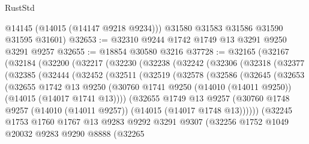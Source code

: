 \begin{lexlean}{RustStd}
\begin{coremodule}
        @14145
        (@14015 (@14147 @9218 @9234)))
      @31580
      @31583
      @31586
      @31590
      @31595
      @31601)
@32653 := @32310 @9244 @1742 @1749 @13 @3291 @9250 @3291 @9257
@32655 := @18854 @30580 @3216
@37728 := @32165
    (@32167
      (@32184
        (@32200
          (@32217
            (@32230
              (@32238
                (@32242
                  (@32306
                    (@32318
                      (@32377
                        (@32385
                          (@32444
                            (@32452
                              (@32511
                                (@32519
                                  (@32578
                                    (@32586
                                      (@32645
                                        (@32653
                                          (@32655
                                            @1742
                                            @13
                                            @9250
                                            (@30760
                                              @1741
                                              @9250
                                              (@14010 (@14011 @9250))
                                              (@14015 (@14017 @1741 @13))))
                                          (@32655
                                            @1749
                                            @13
                                            @9257
                                            (@30760
                                              @1748
                                              @9257
                                              (@14010 (@14011 @9257))
                                              (@14015 (@14017 @1748 @13))))))
                                      (@32245
                                        @1753
                                        @1760
                                        @1767
                                        @13
                                        @9283
                                        @9292
                                        @3291
                                        @9307
                                        (@32256
                                          @1752
                                          @1049
                                          @20032
                                          @9283
                                          @9290
                                          @8888
                                          (@32265

\end{coremodule}
\end{lexlean}
